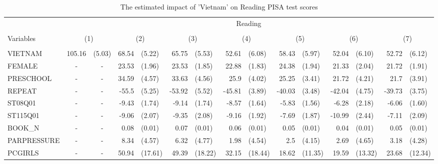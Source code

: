 \documentclass[12pt]{article}%
\begin{document}
	\begin{table}[H]
		\tiny
		\def\arraystretch{1}
		\def\tabcolsep{4}
		\centering
		\caption{The estimated impact of 'Vietnam' on Reading PISA test scores}
		\begin{tabular}{lrlrlrlrlrlrlrl}
			\toprule
			\midrule
			& \multicolumn{14}{c}{Reading} \\
			\cline{2-15} \\
			Variables & \multicolumn{2}{c}{(1)} & \multicolumn{2}{c}{(2)} & \multicolumn{2}{c}{(3)} & \multicolumn{2}{c}{(4)} & \multicolumn{2}{c}{(5)} & \multicolumn{2}{c}{(6)} & \multicolumn{2}{c}{(7)} \\
			\hline\\
			
			VIETNAM & 105.16 & (5.03) & 68.54 & (5.22) & 65.75 & (5.53) & 52.61 & (6.08) & 58.43 & (5.97) & 52.04 & (6.10) & 52.72 & (6.12) \\[0.2em]
			FEMALE & \multicolumn{1}{c}{-} & \multicolumn{1}{c}{-} & 23.53 & (1.96) & 23.53 & (1.85) & 22.88 & (1.83) & 24.38 & (1.94) & 21.33 & (2.04) & 21.72 & (1.91) \\[0.2em]
			PRESCHOOL & \multicolumn{1}{c}{-} & \multicolumn{1}{c}{-} & 34.59 & (4.57) & 33.63 & (4.56) & 25.9  & (4.02) & 25.25 & (3.41) & 21.72 & (4.21) & 21.7  & (3.91) \\[0.2em]
			REPEAT & \multicolumn{1}{c}{-} & \multicolumn{1}{c}{-} & -55.5 & (5.25) & -53.92 & (5.52) & -45.81 & (3.89) & -40.03 & (3.48) & -42.04 & (4.75) & -39.73 & (3.75) \\[0.2em]
			ST08Q01 & \multicolumn{1}{c}{-} & \multicolumn{1}{c}{-} & -9.43 & (1.74) & -9.14 & (1.74) & -8.57 & (1.64) & -5.83 & (1.56) & -6.28 & (2.18) & -6.06 & (1.60) \\[0.2em]
			ST115Q01 & \multicolumn{1}{c}{-} & \multicolumn{1}{c}{-} & -9.06 & (2.07) & -9.35 & (2.08) & -9.16 & (1.92) & -7.69 & (1.87) & -10.99 & (2.44) & -7.11 & (2.09) \\[0.2em]
			BOOK\_N & \multicolumn{1}{c}{-} & \multicolumn{1}{c}{-} & 0.08  & (0.01) & 0.07  & (0.01) & 0.06  & (0.01) & 0.05  & (0.01) & 0.04  & (0.01) & 0.05  & (0.01) \\[0.2em]
			PARPRESSURE & \multicolumn{1}{c}{-} & \multicolumn{1}{c}{-} & 8.34  & (4.57) & 6.32  & (4.77) & 1.98  & (4.54) & 2.5   & (4.15) & 2.69  & (4.65) & 3.18  & (4.28) \\[0.2em]
			PCGIRLS & \multicolumn{1}{c}{-} & \multicolumn{1}{c}{-} & 50.94 & (17.61) & 49.39 & (18.22) & 32.15 & (18.44) & 18.62 & (11.35) & 19.59 & (13.32) & 23.68 & (12.34) \\[0.2em]

\end{tabular}
\end{table}
\end{document}
